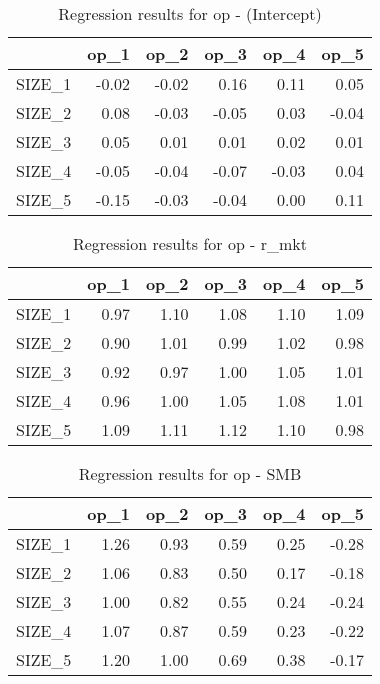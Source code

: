 \begin{table}[ht]
\centering
\caption{Regression results for op - (Intercept)} 
\begin{tabular}{rrrrrr}
  \hline
 & op\_1 & op\_2 & op\_3 & op\_4 & op\_5 \\ 
  \hline
SIZE\_1 & -0.02 & -0.02 & 0.16 & 0.11 & 0.05 \\ 
  SIZE\_2 & 0.08 & -0.03 & -0.05 & 0.03 & -0.04 \\ 
  SIZE\_3 & 0.05 & 0.01 & 0.01 & 0.02 & 0.01 \\ 
  SIZE\_4 & -0.05 & -0.04 & -0.07 & -0.03 & 0.04 \\ 
  SIZE\_5 & -0.15 & -0.03 & -0.04 & 0.00 & 0.11 \\ 
   \hline
\end{tabular}
\end{table}


\begin{table}[ht]
\centering
\caption{Regression results for op - r_mkt} 
\begin{tabular}{rrrrrr}
  \hline
 & op\_1 & op\_2 & op\_3 & op\_4 & op\_5 \\ 
  \hline
SIZE\_1 & 0.97 & 1.10 & 1.08 & 1.10 & 1.09 \\ 
  SIZE\_2 & 0.90 & 1.01 & 0.99 & 1.02 & 0.98 \\ 
  SIZE\_3 & 0.92 & 0.97 & 1.00 & 1.05 & 1.01 \\ 
  SIZE\_4 & 0.96 & 1.00 & 1.05 & 1.08 & 1.01 \\ 
  SIZE\_5 & 1.09 & 1.11 & 1.12 & 1.10 & 0.98 \\ 
   \hline
\end{tabular}
\end{table}


\begin{table}[ht]
\centering
\caption{Regression results for op - SMB} 
\begin{tabular}{rrrrrr}
  \hline
 & op\_1 & op\_2 & op\_3 & op\_4 & op\_5 \\ 
  \hline
SIZE\_1 & 1.26 & 0.93 & 0.59 & 0.25 & -0.28 \\ 
  SIZE\_2 & 1.06 & 0.83 & 0.50 & 0.17 & -0.18 \\ 
  SIZE\_3 & 1.00 & 0.82 & 0.55 & 0.24 & -0.24 \\ 
  SIZE\_4 & 1.07 & 0.87 & 0.59 & 0.23 & -0.22 \\ 
  SIZE\_5 & 1.20 & 1.00 & 0.69 & 0.38 & -0.17 \\ 
   \hline
\end{tabular}
\end{table}


